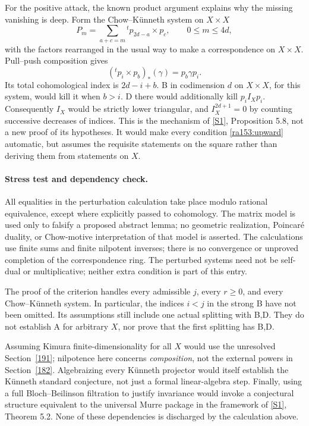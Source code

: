 \documentclass[11pt]{article}
\newcommand{\sref}[2]{\hyperlink{source:#1:#2}{[S#2]}}
\begin{document}
For the positive attack, the known product argument explains why the missing
vanishing is deep.  Form the Chow--K\"unneth system on $X\times X$
\[
 P_m=\sum_{a+c=m}{}^t p_{2d-a}\times p_c,
 \qquad 0\leq m\leq4d,
\]
with the factors rearranged in the usual way to make a correspondence on
$X\times X$.  Pull--push composition gives
\[
 ({}^t p_i\times p_b)_*(\gamma)=p_b\gamma p_i.
\]
Its total cohomological index is $2d-i+b$.  B in codimension $d$ on
$X\times X$, for this system, would kill it when $b>i$.  D there would
additionally kill $p_i I_X p_i$.  Consequently $I_X$ would be strictly
lower triangular, and $I_X^{2d+1}=0$ by counting successive decreases of
indices.  This is the mechanism of \sref{153}{1}, Proposition 5.8, not a new
proof of its hypotheses.  It would make every condition
\eqref{ra153:upward} automatic, but assumes the requisite statements on the
square rather than deriving them from statements on $X$.

\paragraph{Stress test and dependency check.}
All equalities in the perturbation calculation take place modulo rational
equivalence, except where explicitly passed to cohomology.  The matrix model
is used only to falsify a proposed abstract lemma; no geometric realization,
Poincar\'e duality, or Chow-motive interpretation of that model is asserted.
The calculations use finite sums and finite nilpotent inverses; there is no
convergence or unproved completion of the correspondence ring.  The perturbed
systems need not be self-dual or multiplicative; neither extra condition is
part of this entry.

The proof of the criterion handles every admissible $j$, every $r\geq0$,
and every Chow--K\"unneth system.  In particular, the indices $i<j$ in the
strong B have not been omitted.  Its assumptions still include one actual
splitting with B,D.  They do not establish A for arbitrary $X$, nor prove
that the first splitting has B,D.

Assuming Kimura finite-dimensionality for all $X$ would use the unresolved
Section~\ref{191}; nilpotence here concerns \emph{composition}, not the
external powers in Section~\ref{182}.  Algebraizing every K\"unneth projector
would itself establish the K\"unneth standard conjecture, not just a formal
linear-algebra step.  Finally, using a full Bloch--Beilinson filtration to
justify invariance would invoke a conjectural structure equivalent to the
universal Murre package in the framework of \sref{153}{1}, Theorem 5.2.
None of these dependencies is discharged by the calculation above.
\end{document}

